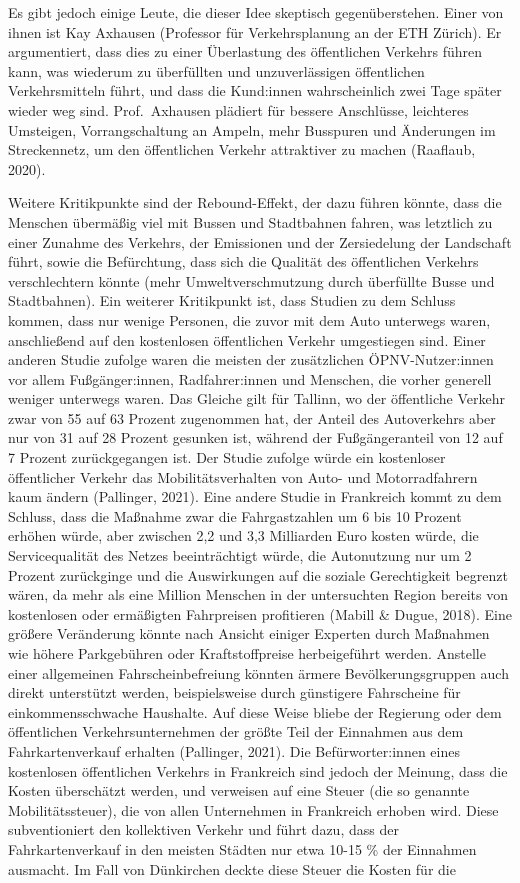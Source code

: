 \documentclass[
]{book}
\begin{document}
Es gibt jedoch einige Leute, die dieser Idee skeptisch gegenüberstehen. Einer von ihnen ist Kay Axhausen (Professor für Verkehrsplanung an der ETH Zürich). Er argumentiert, dass dies zu einer Überlastung des öffentlichen Verkehrs führen kann, was wiederum zu überfüllten und unzuverlässigen öffentlichen Verkehrsmitteln führt, und dass die Kund:innen wahrscheinlich zwei Tage später wieder weg sind. Prof.~Axhausen plädiert für bessere Anschlüsse, leichteres Umsteigen, Vorrangschaltung an Ampeln, mehr Busspuren und Änderungen im Streckennetz, um den öffentlichen Verkehr attraktiver zu machen (Raaflaub, 2020).

Weitere Kritikpunkte sind der Rebound-Effekt, der dazu führen könnte, dass die Menschen übermäßig viel mit Bussen und Stadtbahnen fahren, was letztlich zu einer Zunahme des Verkehrs, der Emissionen und der Zersiedelung der Landschaft führt, sowie die Befürchtung, dass sich die Qualität des öffentlichen Verkehrs verschlechtern könnte (mehr Umweltverschmutzung durch überfüllte Busse und Stadtbahnen). Ein weiterer Kritikpunkt ist, dass Studien zu dem Schluss kommen, dass nur wenige Personen, die zuvor mit dem Auto unterwegs waren, anschließend auf den kostenlosen öffentlichen Verkehr umgestiegen sind. Einer anderen Studie zufolge waren die meisten der zusätzlichen ÖPNV-Nutzer:innen vor allem Fußgänger:innen, Radfahrer:innen und Menschen, die vorher generell weniger unterwegs waren. Das Gleiche gilt für Tallinn, wo der öffentliche Verkehr zwar von 55 auf 63 Prozent zugenommen hat, der Anteil des Autoverkehrs aber nur von 31 auf 28 Prozent gesunken ist, während der Fußgängeranteil von 12 auf 7 Prozent zurückgegangen ist. Der Studie zufolge würde ein kostenloser öffentlicher Verkehr das Mobilitätsverhalten von Auto- und Motorradfahrern kaum ändern (Pallinger, 2021). Eine andere Studie in Frankreich kommt zu dem Schluss, dass die Maßnahme zwar die Fahrgastzahlen um 6 bis 10 Prozent erhöhen würde, aber zwischen 2,2 und 3,3 Milliarden Euro kosten würde, die Servicequalität des Netzes beeinträchtigt würde, die Autonutzung nur um 2 Prozent zurückginge und die Auswirkungen auf die soziale Gerechtigkeit begrenzt wären, da mehr als eine Million Menschen in der untersuchten Region bereits von kostenlosen oder ermäßigten Fahrpreisen profitieren (Mabill \& Dugue, 2018). Eine größere Veränderung könnte nach Ansicht einiger Experten durch Maßnahmen wie höhere Parkgebühren oder Kraftstoffpreise herbeigeführt werden. Anstelle einer allgemeinen Fahrscheinbefreiung könnten ärmere Bevölkerungsgruppen auch direkt unterstützt werden, beispielsweise durch günstigere Fahrscheine für einkommensschwache Haushalte. Auf diese Weise bliebe der Regierung oder dem öffentlichen Verkehrsunternehmen der größte Teil der Einnahmen aus dem Fahrkartenverkauf erhalten (Pallinger, 2021). Die Befürworter:innen eines kostenlosen öffentlichen Verkehrs in Frankreich sind jedoch der Meinung, dass die Kosten überschätzt werden, und verweisen auf eine Steuer (die so genannte Mobilitätssteuer), die von allen Unternehmen in Frankreich erhoben wird. Diese subventioniert den kollektiven Verkehr und führt dazu, dass der Fahrkartenverkauf in den meisten Städten nur etwa 10-15 \% der Einnahmen ausmacht. Im Fall von Dünkirchen deckte diese Steuer die Kosten für die 
\end{document}
